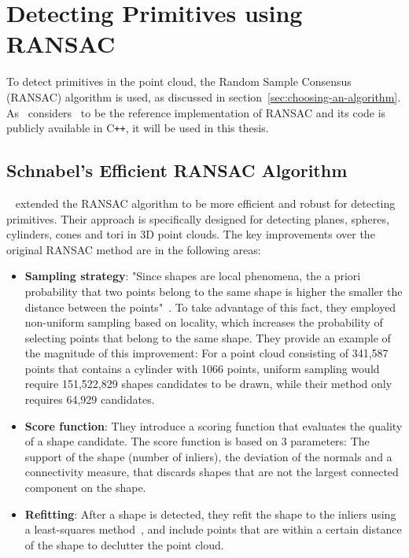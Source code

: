 \section{Detecting Primitives using RANSAC}\label{sec:detecting-primitives-using-ransac}

To detect primitives in the point cloud, the Random Sample Consensus (RANSAC) algorithm is used,
as discussed in section~\ref{sec:choosing-an-algorithm}.
As~\cite{kaiser_survey_2019} considers~\parencite{schnabel_efficient_2007} to be the reference implementation of RANSAC
and its code is publicly available in C\texttt{++}, it will be used in this thesis.

\subsection{Schnabel's Efficient RANSAC Algorithm}\label{subsec:schnabels-efficient-ransac-algorithm}
\citeauthor{schnabel_efficient_2007}~\cite{schnabel_efficient_2007} extended the RANSAC algorithm to be more efficient
and robust for detecting primitives.
Their approach is specifically designed for detecting planes, spheres, cylinders, cones and tori in 3D point clouds.
The key improvements over the original RANSAC method are in the following areas:
\begin{itemize}
    \item \textbf{Sampling strategy}: "Since shapes are local phenomena, the a priori probability that two points belong to the same shape is higher the smaller the distance between the points"~\parencite{schnabel_efficient_2007}.
    To take advantage of this fact, they employed non-uniform sampling based on locality, which increases the probability of selecting points that belong to the same shape.
    They provide an example of the magnitude of this improvement: For a point cloud consisting of 341,587 points that contains a cylinder with 1066 points, uniform sampling would require 151,522,829 shapes candidates to be drawn, while their method only requires 64,929 candidates.
    \item \textbf{Score function}: They introduce a scoring function that evaluates the quality of a shape candidate.
    The score function is based on 3 parameters: The support of the shape (number of inliers), the deviation of the normals and a connectivity measure, that discards shapes that are not the largest connected component on the shape.
    \item \textbf{Refitting}: After a shape is detected, they refit the shape to the inliers using a least-squares method~\cite{shakarji_least-squares_1998}, and include points that are within a certain distance of the shape to declutter the point cloud.
\end{itemize}

